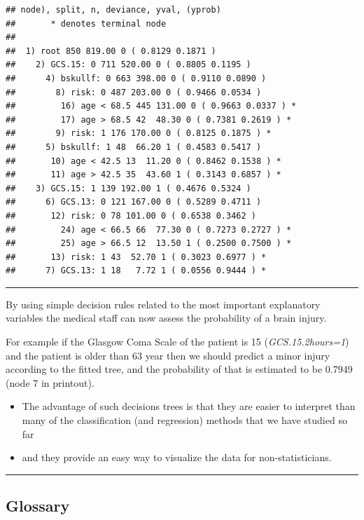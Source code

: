 \documentclass[]{article}
\providecommand{\tightlist}{%
  \setlength{\itemsep}{0pt}\setlength{\parskip}{0pt}}
\begin{document}
\begin{verbatim}
## node), split, n, deviance, yval, (yprob)
##       * denotes terminal node
## 
##  1) root 850 819.00 0 ( 0.8129 0.1871 )  
##    2) GCS.15: 0 711 520.00 0 ( 0.8805 0.1195 )  
##      4) bskullf: 0 663 398.00 0 ( 0.9110 0.0890 )  
##        8) risk: 0 487 203.00 0 ( 0.9466 0.0534 )  
##         16) age < 68.5 445 131.00 0 ( 0.9663 0.0337 ) *
##         17) age > 68.5 42  48.30 0 ( 0.7381 0.2619 ) *
##        9) risk: 1 176 170.00 0 ( 0.8125 0.1875 ) *
##      5) bskullf: 1 48  66.20 1 ( 0.4583 0.5417 )  
##       10) age < 42.5 13  11.20 0 ( 0.8462 0.1538 ) *
##       11) age > 42.5 35  43.60 1 ( 0.3143 0.6857 ) *
##    3) GCS.15: 1 139 192.00 1 ( 0.4676 0.5324 )  
##      6) GCS.13: 0 121 167.00 0 ( 0.5289 0.4711 )  
##       12) risk: 0 78 101.00 0 ( 0.6538 0.3462 )  
##         24) age < 66.5 66  77.30 0 ( 0.7273 0.2727 ) *
##         25) age > 66.5 12  13.50 1 ( 0.2500 0.7500 ) *
##       13) risk: 1 43  52.70 1 ( 0.3023 0.6977 ) *
##      7) GCS.13: 1 18   7.72 1 ( 0.0556 0.9444 ) *
\end{verbatim}

\normalsize

\begin{center}\rule{0.5\linewidth}{\linethickness}\end{center}

By using simple decision rules related to the most important explanatory
variables the medical staff can now assess the probability of a brain
injury.

For example if the Glasgow Coma Scale of the patient is 15
(\emph{GCS.15.2hours=1}) and the patient is older than 63 year then we
should predict a minor injury according to the fitted tree, and the
probability of that is estimated to be 0.7949 (node 7 in printout).

\begin{itemize}
\tightlist
\item
  The advantage of such decisions trees is that they are easier to
  interpret than many of the classification (and regression) methods
  that we have studied so far
\item
  and they provide an easy way to visualize the data for
  non-statisticians.
\end{itemize}

\begin{center}\rule{0.5\linewidth}{\linethickness}\end{center}

\hypertarget{glossary}{%
\subsection{Glossary}\label{glossary}}
\end{document}
